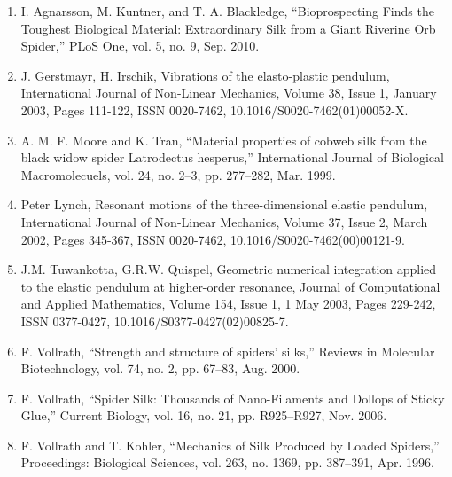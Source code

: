 \begin{enumerate}

\item I. Agnarsson, M. Kuntner, and T. A. Blackledge, “Bioprospecting Finds the Toughest Biological Material: Extraordinary Silk from a Giant Riverine Orb Spider,” PLoS One, vol. 5, no. 9, Sep. 2010.

\item J. Gerstmayr, H. Irschik, Vibrations of the elasto-plastic pendulum, International Journal of Non-Linear Mechanics, Volume 38, Issue 1, January 2003, Pages 111-122, ISSN 0020-7462, 10.1016/S0020-7462(01)00052-X.

\item A. M. F. Moore and K. Tran, “Material properties of cobweb silk from the black widow spider Latrodectus hesperus,” International Journal of Biological Macromolecuels, vol. 24, no. 2–3, pp. 277–282, Mar. 1999.

\item Peter Lynch, Resonant motions of the three-dimensional elastic pendulum, International Journal of Non-Linear Mechanics, Volume 37, Issue 2, March 2002, Pages 345-367, ISSN 0020-7462, 10.1016/S0020-7462(00)00121-9.

\item J.M. Tuwankotta, G.R.W. Quispel, Geometric numerical integration applied to the elastic pendulum at higher-order resonance, Journal of Computational and Applied Mathematics, Volume 154, Issue 1, 1 May 2003, Pages 229-242, ISSN 0377-0427, 10.1016/S0377-0427(02)00825-7.

\item F. Vollrath, “Strength and structure of spiders’ silks,” Reviews in Molecular Biotechnology, vol. 74, no. 2, pp. 67–83, Aug. 2000.

\item F. Vollrath, “Spider Silk: Thousands of Nano-Filaments and Dollops of Sticky Glue,” Current Biology, vol. 16, no. 21, pp. R925–R927, Nov. 2006.

\item F. Vollrath and T. Kohler, “Mechanics of Silk Produced by Loaded Spiders,” Proceedings: Biological Sciences, vol. 263, no. 1369, pp. 387–391, Apr. 1996.

\end{enumerate}